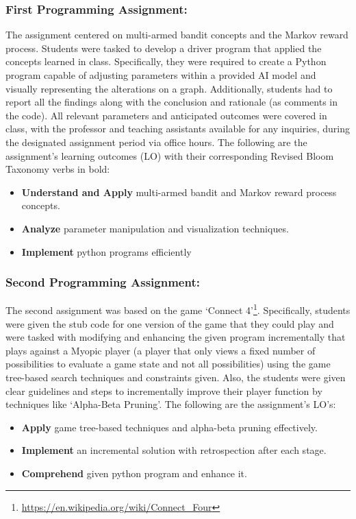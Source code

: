 \subsubsection{First Programming Assignment:} The assignment centered on multi-armed bandit concepts and the Markov reward process. Students were tasked to develop a driver program that applied the concepts learned in class. Specifically, they were required to create a Python program capable of adjusting parameters within a provided AI model and visually representing the alterations on a graph. Additionally, students had to report all the findings along with the conclusion and rationale (as comments in the code). All relevant parameters and anticipated outcomes were covered in class, with the professor and teaching assistants available for any inquiries, during the designated assignment period via office hours. The following are the assignment's learning outcomes (LO) with their corresponding Revised Bloom Taxonomy \cite{bloomsTaxonomy} verbs in bold:
\begin{itemize}
    \item \textbf{Understand and Apply} multi-armed bandit and Markov reward process concepts. 
    \item \textbf{Analyze} parameter manipulation and visualization techniques. 
    \item \textbf{Implement} python programs efficiently 
\end{itemize}

\subsubsection{Second Programming Assignment:} The second assignment was based on the game `Connect 4'\footnote{\url{https://en.wikipedia.org/wiki/Connect_Four}}. Specifically, students were given the stub code for one version of the game that they could play and were tasked with modifying and enhancing the given program incrementally that plays against a Myopic player (a player that only views a fixed number of possibilities to evaluate a game state and not all possibilities) using the game tree-based search techniques and constraints given. Also, the students were given clear guidelines and steps to incrementally improve their player function by techniques like `Alpha-Beta Pruning'. The following are the assignment's LO's:
\begin{itemize}
    \item \textbf{Apply} game tree-based techniques and alpha-beta pruning effectively.
    \item \textbf{Implement} an incremental solution with retrospection after each stage.  
    \item \textbf{Comprehend} given python program and enhance it.
\end{itemize}

